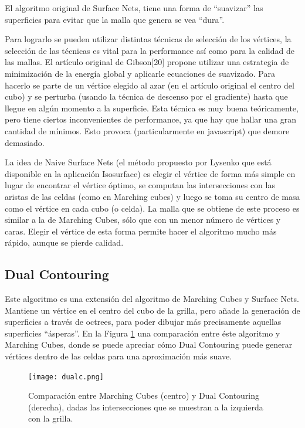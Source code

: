 \documentclass[12pt]{article}
\begin{document}
El algoritmo original de Surface Nets\cite{surfacenets}, tiene una forma de “suavizar” las superficies para evitar  que la malla que genera se vea “dura”.

Para lograrlo se pueden utilizar distintas técnicas de selección de los vértices, la selección de las técnicas es vital para la performance así como para la calidad de las mallas. El artículo original de Gibson[20]  propone utilizar una estrategia de minimización de la energía global y aplicarle ecuaciones de suavizado. Para hacerlo se parte de un vértice elegido al azar (en el artículo original el centro del cubo)  y se perturba (usando la técnica de descenso por el gradiente) hasta que llegue en algún momento a la superficie. Esta técnica es muy buena teóricamente, pero tiene ciertos inconvenientes de performance, ya que hay que hallar una gran cantidad de mínimos. Esto provoca (particularmente en javascript) que demore demasiado.

La idea de Naive Surface Nets (el método propuesto por Lysenko\cite{mykola2} que está disponible en la aplicación Isosurface) es elegir el vértice de forma más simple  en lugar de encontrar el vértice óptimo, se computan las intersecciones con las aristas de las celdas (como en Marching cubes) y luego se toma su centro de masa como el vértice en cada cubo (o celda). La malla que se obtiene de este proceso es similar a la de Marching Cubes, sólo que con un menor número de vértices y caras. Elegir el vértice de esta forma permite hacer el algoritmo mucho más rápido, aunque se pierde calidad.
\subsection{Dual Contouring}
\noindent Este algoritmo es una extensión del algoritmo de Marching Cubes y Surface Nets. Mantiene un vértice en el centro del cubo de la grilla, pero añade la generación de superficies a través de octrees, para poder dibujar más precisamente aquellas superficies “ásperas”\cite{dualcontour}. En la Figura \ref{dual} una comparación entre éste algoritmo y Marching Cubes, donde se puede apreciar cómo Dual Contouring puede generar vértices dentro de las celdas para una aproximación más suave.

\begin{figure}[h!]
\texttt{[image: dualc.png]}
\caption{ Comparación entre Marching Cubes (centro) y Dual Contouring (derecha), dadas las intersecciones que se muestran a la izquierda con la grilla.}
\label{dual}
\end{figure}
\end{document}
